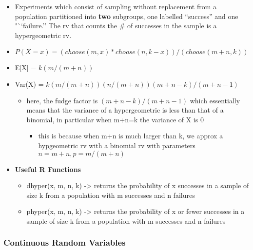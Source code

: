 \documentclass[
]{article}
\providecommand{\tightlist}{%
  \setlength{\itemsep}{0pt}\setlength{\parskip}{0pt}}
\begin{document}
\begin{itemize}
\tightlist
\item
  Experiments which consist of sampling without replacement from a
  population partitioned into \textbf{two} subgroups, one labelled
  ``success'' and one "``failure.'' The rv that counts the \# of
  successes in the sample is a hypergeometric rv.
\item
  \(P(X = x) = (choose(m, x) * choose(n, k-x))/(choose(m+n, k))\)
\item
  E{[}X{]} = \(k(m/(m+n))\)
\item
  Var(X) = \(k(m/(m+n))(n/(m+n))(m+n-k)/(m+n-1)\)

  \begin{itemize}
  \tightlist
  \item
    here, the fudge factor is \((m+n-k)/(m+n-1)\) which essentially
    means that the variance of a hypergeometric is less than that of a
    binomial, in particular when m+n=k the variance of X is 0

    \begin{itemize}
    \tightlist
    \item
      this is because when m+n is much larger than k, we approx a
      hypgeometric rv with a binomial rv with parameters
      \(n = m + n, p = m/(m+n)\)
    \end{itemize}
  \end{itemize}
\item
  \textbf{Useful R Functions}

  \begin{itemize}
  \tightlist
  \item
    dhyper(x, m, n, k) -\textgreater{} returns the probability of x
    successes in a sample of size k from a population with m successes
    and n failures
  \item
    phyper(x, m, n, k) -\textgreater{} returns the probability of x or
    fewer successes in a sample of size k from a population with m
    successes and n failures
  \end{itemize}
\end{itemize}

\hypertarget{continuous-random-variables}{%
\subsubsection{Continuous Random
Variables}\label{continuous-random-variables}}
\end{document}
